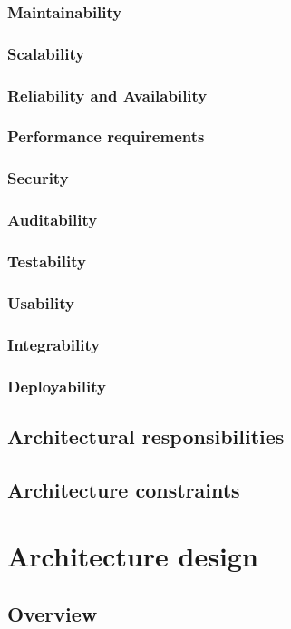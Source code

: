 \documentclass[a4paper,12pt,titlepage]{article}
\begin{document}
			\subsubsection{Maintainability}	
			\subsubsection{Scalability}	
			\subsubsection{Reliability and Availability}
			\subsubsection{Performance requirements}	
			\subsubsection{Security}	
			\subsubsection{Auditability}
			\subsubsection{Testability}	
			\subsubsection{Usability}	
			\subsubsection{Integrability}
			\subsubsection{Deployability}
	\subsection{Architectural responsibilities}
	\subsection{Architecture constraints}
	
	
\section{Architecture design}
	\subsection{Overview}
\end{document}
